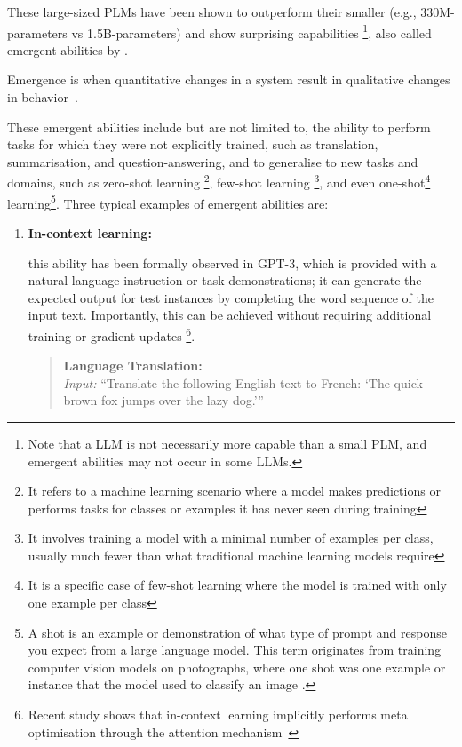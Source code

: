\begin{enumerate}
{\begin{itemize}
		      \end{itemize}
		      These large-sized PLMs have been shown to outperform their smaller (e.g., 330M-parameters vs 1.5B-parameters) and show surprising capabilities \footnote{Note that a LLM is not necessarily more capable than a small PLM, and emergent abilities may not occur in some LLMs.}, also called emergent abilities by \textcite{wei2022emergent}.
		      \begin{displayquote}
			      Emergence is when quantitative changes in a system result in qualitative changes in behavior~\cite{anderson1972more}.
		      \end{displayquote}
		      These emergent abilities include but are not limited to, the ability to perform tasks for which they were not explicitly trained, such as translation, summarisation, and question-answering, and to generalise to new tasks and domains, such as zero-shot learning \footnote{It refers to a machine learning scenario where a model makes predictions or performs tasks for classes or examples it has never seen during training}, few-shot learning \footnote{It involves training a model with a minimal number of examples per class, usually much fewer than what traditional machine learning models require}, and even one-shot\footnote{It is a specific case of few-shot learning where the model is trained with only one example per class} learning\footnote{A shot is an example or demonstration of what type of prompt and response you expect from a large language model. This term originates from training computer vision models on photographs, where one shot was one example or instance that the model used to classify an image \cite{feifei2006onedatacoltut}.}.
		      Three typical examples of emergent abilities are:
		      \begin{enumerate}
			      \item \textbf{In-context learning:} {this ability has been formally observed in GPT-3, which is provided with a natural language instruction or task demonstrations; it can generate the expected output for test instances by completing the word sequence of the input text. Importantly, this can be achieved without requiring additional training or gradient updates \footnote{Recent study shows that in-context learning implicitly performs meta optimisation through the attention mechanism~\cite {dai2022why}}.
				            \begin{quote}
					            \textbf{Language Translation:} \\
					            \textit{Input:} {\enquote{Translate the following English text to French: `The quick brown fox jumps over the lazy dog.'}} \\

\end{quote}}
\end{enumerate}}
\end{enumerate}
